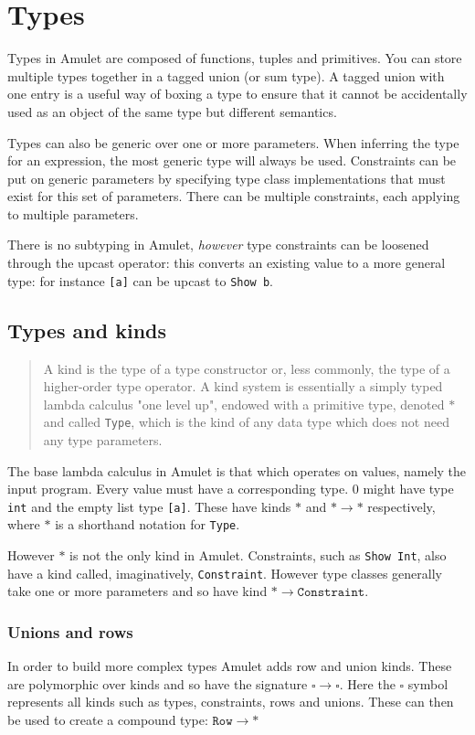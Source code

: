 \section{Types}
Types in Amulet are composed of functions, tuples and primitives. You can store multiple types together in a tagged union (or sum type). A tagged union with one entry is a useful way of boxing a type to ensure that it cannot be accidentally used as an object of the same type but different semantics.

Types can also be generic over one or more parameters. When inferring the type for an expression, the most generic type will always be used. Constraints can be put on generic parameters by specifying type class implementations that must exist for this set of parameters. There can be multiple constraints, each applying to multiple parameters.

There is no subtyping in Amulet, \textit{however} type constraints can be loosened through the upcast operator: this converts an existing value to a more general type: for instance \texttt{[a]} can be upcast to \texttt{Show b}.

\subsection{Types and kinds}
\begin{quote}
A kind is the type of a type constructor or, less commonly, the type of a higher-order type operator. A kind system is essentially a simply typed lambda calculus "one level up", endowed with a primitive type, denoted $*$ and called \texttt{Type}, which is the kind of any data type which does not need any type parameters.\cite{kindsWikipedia}
\end{quote}

The base lambda calculus in Amulet is that which operates on values, namely the input program. Every value must have a corresponding type. 0 might have type \texttt{int} and the empty list type \texttt{[a]}. These have kinds $*$ and $* \to *$ respectively, where $*$ is a shorthand notation for \texttt{Type}.

However $*$ is not the only kind in Amulet. Constraints, such as \texttt{Show Int}, also have a kind called, imaginatively, \texttt{Constraint}.  However type classes generally take one or more parameters and so have kind  $* \to \mathtt{Constraint}$.

\subsubsection{Unions and rows}
In order to build more complex types Amulet adds row and union kinds. These are polymorphic over kinds and so have the signature $\square \to \square$. Here the $\square$ symbol represents all kinds such as types, constraints, rows and unions. These can then be used to create a compound type: $\mathtt{Row} \to *$

